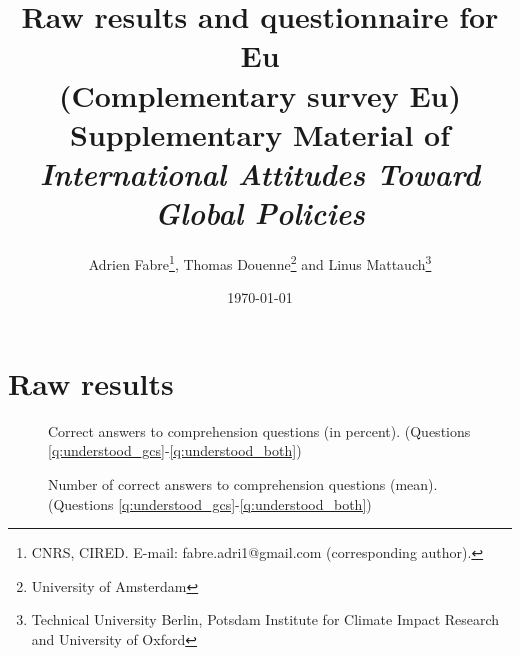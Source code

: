 \documentclass[12pt,english]{article}
\title{Raw results and questionnaire for Eu \\
(Complementary survey Eu) \\ 
Supplementary Material of \\
\textit{International Attitudes Toward Global Policies}
}
\author{Adrien Fabre\footnote{CNRS, CIRED. E-mail: fabre.adri1@gmail.com (corresponding author).}, Thomas Douenne\footnote{University of Amsterdam}\; and Linus Mattauch\footnote{Technical University Berlin, Potsdam Institute for Climate Impact Research and University of Oxford}} %
\date{\today} %
\begin{document}
\maketitle

\tableofcontents

\clearpage
\listoffigures


\clearpage
\section{Raw results}\label{app:raw_results_EU}

\begin{figure}[h!]
    \caption[Comprehension]{Correct answers to comprehension questions (in percent). (Questions \ref{q:understood_gcs}-\ref{q:understood_both})}\label{fig:understood_each}
\end{figure}

\begin{figure}[h!]
    \caption[Comprehension score]{Number of correct answers to comprehension questions (mean). (Questions \ref{q:understood_gcs}-\ref{q:understood_both})}\label{fig:understood_score}
\end{figure}
\end{document}
